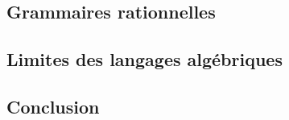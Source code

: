 \subsection{Grammaires rationnelles}






 
\subsection{Limites des langages algébriques}



 
\subsection{Conclusion}





\endgroup
\endinput

